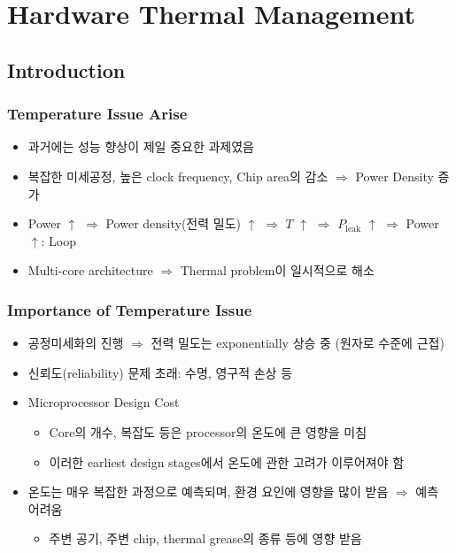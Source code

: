 \section{Hardware Thermal Management}

\subsection{Introduction}

\subsubsection*{Temperature Issue Arise}
\begin{itemize}
    \item 과거에는 성능 향상이 제일 중요한 과제였음
    \item 복잡한 미세공정, 높은 clock frequency, Chip area의 감소 $\Rightarrow$ Power Density 증가
    \item Power $\uparrow$ $\Rightarrow$ Power density(전력 밀도) $\uparrow$ $\Rightarrow$ $T$ $\uparrow$ $\Rightarrow$ $P_{\mathrm{leak}}$ $\uparrow$ $\Rightarrow$ Power $\uparrow$: Loop
    \item Multi-core architecture $\Rightarrow$ Thermal problem이 일시적으로 해소
\end{itemize}

\subsubsection*{Importance of Temperature Issue}
\begin{itemize}
    \item 공정미세화의 진행 $\Rightarrow$ 전력 밀도는 exponentially 상승 중 (원자로 수준에 근접)
    \item 신뢰도(reliability) 문제 초래: 수명, 영구적 손상 등
    \item Microprocessor Design Cost
    \begin{itemize}
        \item Core의 개수, 복잡도 등은 processor의 온도에 큰 영향을 미침
        \item 이러한 earliest design stages에서 온도에 관한 고려가 이루어져야 함
    \end{itemize}
    \item 온도는 매우 복잡한 과정으로 예측되며, 환경 요인에 영향을 많이 받음 $\Rightarrow$ 예측 어려움
    \begin{itemize}
        \item 주변 공기, 주변 chip, thermal grease의 종류 등에 영향 받음
    \end{itemize}
\end{itemize}

